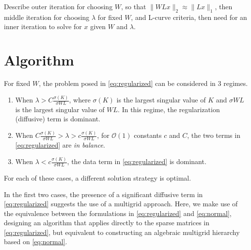 \documentclass{article}
\begin{document}
Describe outer iteration for choosing $W$, so that $\|WLx\|_2 \approx
\|Lx\|_1$, then middle iteration for choosing $\lambda$ for fixed $W$,
and L-curve criteria, then need for an inner iteration to solve for
$x$ given $W$ and $\lambda$.

\section{Algorithm}

For fixed $W$, the problem posed in \eqref{eq:regularized} can be
considered in 3 regimes.
\begin{enumerate}
\item When $\lambda > C \frac{\sigma(K)}{\sigma{WL}}$, where
  $\sigma(K)$ is the largest singular value of $K$ and $\sigma{WL}$ is
  the largest singular value of $WL$.  In this regime, the
  regularization (diffusive) term is dominant.
\item When $C \frac{\sigma(K)}{\sigma{WL}} > \lambda > c
  \frac{\sigma(K)}{\sigma{WL}}$, for $\mathcal{O}(1)$ constants $c$
  and $C$, the two terms in \eqref{eq:regularized} are {\it in
    balance}.
\item When $\lambda < c \frac{\sigma(K)}{\sigma{WL}}$, the data term
  in \eqref{eq:regularized} is dominant.
\end{enumerate}
For each of these cases, a different solution strategy is optimal.

In the first two cases, the presence of a significant diffusive term
in \eqref{eq:regularized} suggests the use of a multigrid approach.
Here, we make use of the equivalence between the formulations in
\eqref{eq:regularized} and \eqref{eq:normal}, designing an algorithm
that applies directly to the sparse matrices in
\eqref{eq:regularized}, but equivalent to constructing an algebraic
multigrid hierarchy \cite{} based on \eqref{eq:normal}.
\end{document}
